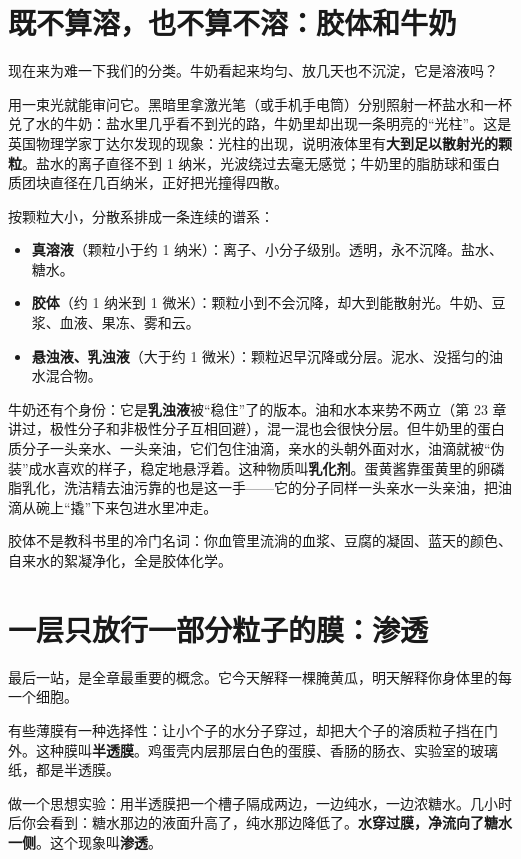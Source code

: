 \section{既不算溶，也不算不溶：胶体和牛奶}

现在来为难一下我们的分类。牛奶看起来均匀、放几天也不沉淀，它是溶液吗？

用一束光就能审问它。黑暗里拿激光笔（或手机手电筒）分别照射一杯盐水和一杯兑了水的牛奶：盐水里几乎看不到光的路，牛奶里却出现一条明亮的“光柱”。这是英国物理学家丁达尔发现的现象：光柱的出现，说明液体里有\textbf{大到足以散射光的颗粒}。盐水的离子直径不到 1 纳米，光波绕过去毫无感觉；牛奶里的脂肪球和蛋白质团块直径在几百纳米，正好把光撞得四散。

按颗粒大小，分散系排成一条连续的谱系：

\begin{itemize}[itemsep=2pt]
\item \textbf{真溶液}（颗粒小于约 1 纳米）：离子、小分子级别。透明，永不沉降。盐水、糖水。
\item \textbf{胶体}（约 1 纳米到 1 微米）：颗粒小到不会沉降，却大到能散射光。牛奶、豆浆、血液、果冻、雾和云。
\item \textbf{悬浊液、乳浊液}（大于约 1 微米）：颗粒迟早沉降或分层。泥水、没摇匀的油水混合物。
\end{itemize}

牛奶还有个身份：它是\textbf{乳浊液}被“稳住”了的版本。油和水本来势不两立（第 23 章讲过，极性分子和非极性分子互相回避），混一混也会很快分层。但牛奶里的蛋白质分子一头亲水、一头亲油，它们包住油滴，亲水的头朝外面对水，油滴就被“伪装”成水喜欢的样子，稳定地悬浮着。这种物质叫\textbf{乳化剂}。蛋黄酱靠蛋黄里的卵磷脂乳化，洗洁精去油污靠的也是这一手——它的分子同样一头亲水一头亲油，把油滴从碗上“撬”下来包进水里冲走。

胶体不是教科书里的冷门名词：你血管里流淌的血浆、豆腐的凝固、蓝天的颜色、自来水的絮凝净化，全是胶体化学。

\section{一层只放行一部分粒子的膜：渗透}

最后一站，是全章最重要的概念。它今天解释一棵腌黄瓜，明天解释你身体里的每一个细胞。

有些薄膜有一种选择性：让小个子的水分子穿过，却把大个子的溶质粒子挡在门外。这种膜叫\textbf{半透膜}。鸡蛋壳内层那层白色的蛋膜、香肠的肠衣、实验室的玻璃纸，都是半透膜。

做一个思想实验：用半透膜把一个槽子隔成两边，一边纯水，一边浓糖水。几小时后你会看到：糖水那边的液面升高了，纯水那边降低了。\textbf{水穿过膜，净流向了糖水一侧}。这个现象叫\textbf{渗透}。

